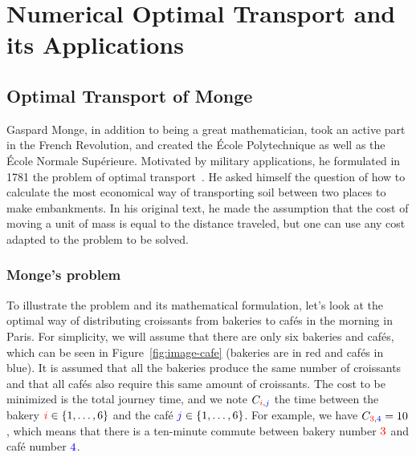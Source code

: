 
\newcommand{\Blu}[1]{{\color{blue}#1}}
\newcommand{\Red}[1]{{\color{red}#1}}
\newcommand{\iC}{\Red{i}}
\newcommand{\jC}{\Blu{j}}
\newcommand{\aC}{\Red{a}}
\newcommand{\bC}{\Blu{b}}


\ifdefined\otarticle
\newcommand{\myparagraph}[1]{\subsection{#1}}
\else
\chapter{Numerical Optimal Transport and its Applications}
\label{chap-ot}
\fi

\label{chap-ot}


\section{Optimal Transport of Monge}

Gaspard Monge, in addition to being a great mathematician, took an active part in the French Revolution, and created the \'Ecole Polytechnique as well as the \'Ecole Normale Sup\'erieure. Motivated by military applications, he formulated in 1781 the problem of optimal transport~\cite{Monge1781}. He asked himself the question of how to calculate the most economical way of transporting soil between two places to make embankments. In his original text, he made the assumption that the cost of moving a unit of mass is equal to the distance traveled, but one can use any cost adapted to the problem to be solved.

\myparagraph{Monge's problem}

To illustrate the problem and its mathematical formulation, let's look at the optimal way of distributing croissants from bakeries to caf\'es in the morning in Paris. For simplicity, we will assume that there are only six bakeries and caf\'es, which can be seen in Figure~\ref{fig:image-cafe} (bakeries are in \Red{red} and caf\'es in \Blu{blue}). 
%
It is assumed that all the bakeries produce the same number of croissants and that all caf\'es also require this same amount of croissants.
%
The cost to be minimized is the total journey time, and we note $C_{\iC, \jC}$  the time between the bakery $\iC \in \{1, \ldots, 6\}$ and the caf\'e $\jC \in \{1, \ldots, 6\}$. For example, we have $C_{\Red{3}, \Blu{4}} = 10$, which means that there is a ten-minute commute between bakery number $\Red{3}$ and caf\'e number $\Blu{4}$.

